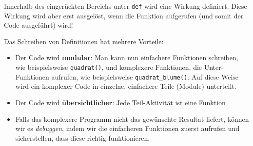 \begin{myoverview}
	Innerhalb des eingerückten Bereichs unter \lstinline|def| wird eine Wirkung definiert. Diese Wirkung wird aber erst ausgelöst, wenn die Funktion aufgerufen (und somit der Code ausgeführt) wird!

	Das Schreiben von Definitionen hat mehrere Vorteile:
	\begin{itemize}
		\item Der Code wird \textbf{modular}: Man kann nun einfachere Funktionen schreiben, wie beispielsweise \lstinline|quadrat()|, und komplexere Funktionen, die Unter-Funktionen aufrufen, wie beispielsweise \lstinline|quadrat_blume()|. Auf diese Weise wird ein komplexer Code in einzelne, einfachere Teile (Module) unterteilt.
		\item Der Code wird \textbf{übersichtlicher}: Jede Teil-Aktivität ist eine Funktion
		\item Falls das komplexere Programm nicht das gewünschte Resultat liefert, können wir es \textit{debuggen}, indem wir die einfacheren Funktionen zuerst aufrufen und sicherstellen, dass diese richtig funktionieren.
	\end{itemize}
\end{myoverview}

